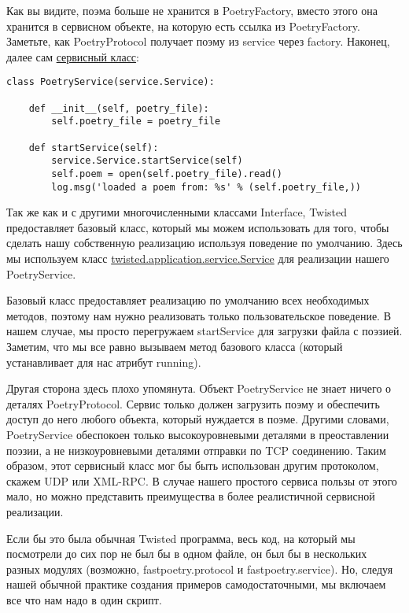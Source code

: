 Как вы видите, поэма больше не хранится в PoetryFactory, 
вместо этого она хранится в сервисном объекте, на которую 
есть ссылка из PoetryFactory. Заметьте, как PoetryProtocol получает 
поэму из service через factory. Наконец, далее сам 
\href{http://github.com/jdavisp3/twisted-intro/blob/master/twisted-server-3/fastpoetry.py#L27}{сервисный класс}:

 \begin{verbatim}
class PoetryService(service.Service):

    def __init__(self, poetry_file):
        self.poetry_file = poetry_file

    def startService(self):
        service.Service.startService(self)
        self.poem = open(self.poetry_file).read()
        log.msg('loaded a poem from: %s' % (self.poetry_file,))
\end{verbatim} 


Так же как и с другими многочисленными классами Interface, 
Twisted предоставляет базовый класс, который мы можем 
использовать для того, чтобы сделать нашу 
собственную реализацию используя поведение по 
умолчанию. Здесь мы используем класс 
\href{http://twistedmatrix.com/trac/browser/tags/releases/twisted-10.0.0/twisted/application/service.py#L154}{twisted.application.service.Service} для реализации 
нашего PoetryService.


Базовый класс предоставляет реализацию по умолчанию 
всех необходимых методов, поэтому нам нужно 
реализовать только пользовательское поведение. В нашем случае, 
мы просто перегружаем startService для 
загрузки файла с поэзией. Заметим, что мы все равно вызываем 
метод базового класса (который устанавливает для нас 
атрибут running).


Другая сторона здесь плохо упомянута. Объект PoetryService 
не знает ничего о деталях PoetryProtocol. Сервис только 
должен загрузить поэму и обеспечить доступ до него любого 
объекта, который нуждается в поэме. Другими словами, 
PoetryService обеспокоен только высокоуровневыми деталями 
в преоставлении поэзии, а не низкоуровневыми деталями 
отправки по TCP соединению. Таким образом, этот сервисный 
класс мог бы быть использован другим протоколом, скажем UDP или 
XML-RPC. В случае нашего простого сервиса пользы от этого мало, 
но можно представить преимущества в более реалистичной сервисной реализации. 


Если бы это была обычная Twisted программа, весь код, 
на который мы посмотрели до сих пор не был бы в одном файле, 
он был бы в нескольких разных модулях (возможно, 
fastpoetry.protocol и fastpoetry.service). Но, следуя нашей 
обычной практике создания примеров самодостаточными, мы 
включаем все что нам надо в один скрипт.

